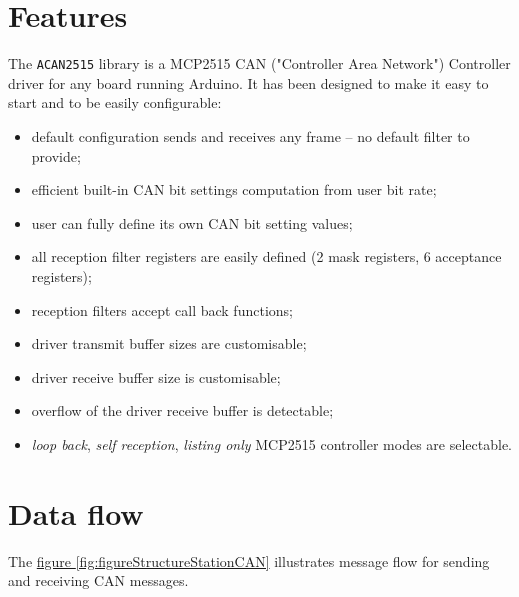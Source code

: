 \documentclass[10pt, a4paper, obeyspaces]{extarticle}
\newcommand\refFigure[2]{\hyperref[fig:#2]{figure \ref*{fig:#2}{\ifthenelse{\equal{#1}{}}{}{.#1}}}}
\begin{document}
\section{Features}

The \texttt{ACAN2515} library is a MCP2515 CAN ("Controller Area Network") Controller driver for any board running Arduino. It has been designed to make it easy to start and to be easily configurable:
\begin{itemize}
  \item default configuration sends and receives any frame -- no default filter to provide;
  \item efficient built-in CAN bit settings computation from user bit rate;
  \item user can fully define its own CAN bit setting values;
  \item all reception filter registers are easily defined (2 mask registers, 6 acceptance registers);
  \item reception filters accept call back functions;
  \item driver transmit buffer sizes are customisable;
  \item driver receive buffer size is customisable;
  \item overflow of the driver receive buffer is detectable;
  \item \emph{loop back}, \emph{self reception}, \emph{listing only} MCP2515 controller modes are selectable.
\end{itemize}



\section{Data flow}

The \refFigure{}{figureStructureStationCAN} illustrates message flow for sending and receiving CAN messages.
\end{document}
